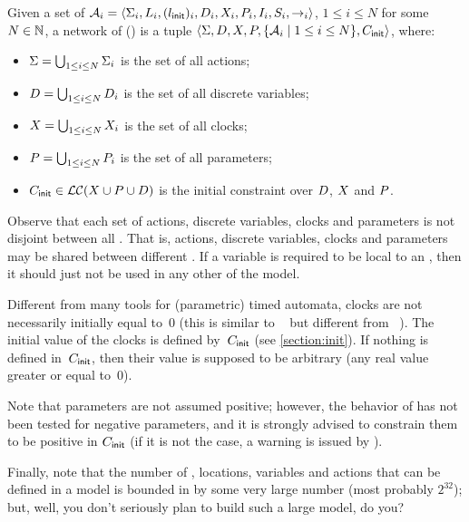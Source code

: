 \begin{definition}[\NIPTA{}]
	Given a set of \IPTA{} $\mathcal{A}_i = \langle\Sigma_i, L_i, (l_{\textsf{init}})_i, D_i, X_i, P_i, I_i, S_i, {\rightarrow}_i\rangle$, $1 \leq i \leq N$ for some $N \in {\mathbb N}$,
	a network of \IPTA{} (\emph{\NIPTA{}}) is a tuple
		$\langle\Sigma, D, X, P, \{ \mathcal{A}_i \mid 1 \leq i \leq N \}, C_{\textsf{init}}\rangle$, where:
	\begin{itemize}
		\item $\Sigma = \bigcup_{1 \leq i \leq N} \Sigma_i$ is the set of all actions;
		\item $D = \bigcup_{1 \leq i \leq N} D_i$ is the set of all discrete variables;
		\item $X = \bigcup_{1 \leq i \leq N} X_i$ is the set of all clocks;
		\item $P = \bigcup_{1 \leq i \leq N} P_i$ is the set of all parameters;
		\item $C_{\textsf{init}} \in \mathcal{LC}(X \cup P \cup D)$ is the initial constraint over $D$, $X$ and $P$. %
	\end{itemize}
\end{definition}

Observe that each set of actions, discrete variables, clocks and parameters is not disjoint between all \IPTA{}.
That is, actions, discrete variables, clocks and parameters may be shared between different \IPTA{}.
If a variable is required to be local to an \IPTA{}, then it should just not be used in any other \IPTA{} of the model.

Different from many tools for (parametric) timed automata, clocks are not necessarily initially equal to~0 (this is similar to \hytech{}~\cite{HHW95} but different from \uppaal{}~\cite{LPY97}).
The initial value of the clocks is defined by~$C_{\textsf{init}}$ (see \cref{section:init}).
If nothing is defined in~$C_{\textsf{init}}$, then their value is supposed to be arbitrary (any real value greater or equal to~0).

Note that parameters are not assumed positive; however, the behavior of \imitator{} has not been tested for negative parameters, and it is strongly advised to constrain them to be positive in $C_{\textsf{init}}$ (if it is not the case, a warning is issued by \imitator{}).


Finally, note that the number of \IPTA{}, locations, variables and actions that can be defined in a model is bounded in \imitator{} by some very large number (most probably $2^{32}$); but, well, you don't seriously plan to build such a large model, do you?




